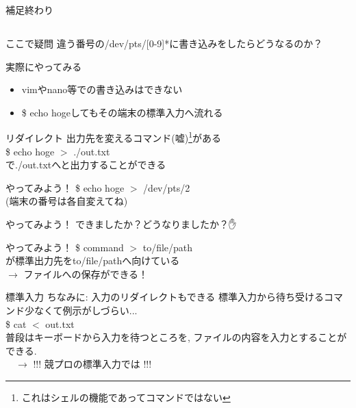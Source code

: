 \documentclass[uplatex, dvipdfmx, unicode]{beamer}
\begin{document}
\begin{frame}
  \centering
  補足終わり
\end{frame}

\subsection{}
\begin{frame}{ここで疑問}
  違う番号の/dev/pts/[0-9]*に書き込みをしたらどうなるのか？
\end{frame}

\begin{frame}{実際にやってみる}
  \begin{itemize}
    \item{vimやnano等での書き込みはできない}
    \item{\$ echo hogeしてもその端末の標準入力へ流れる}
  \end{itemize}
\end{frame}

\begin{frame}{リダイレクト}
  出力先を変えるコマンド(嘘)\footnote{これはシェルの機能であってコマンドではない}がある \\
  \$ echo hoge \alert{$>$ ./out.txt} \\
  で./out.txtへと出力することができる
\end{frame}

\begin{frame}{やってみよう！}
  \$ echo hoge $>$ /dev/pts/2 \\
  (端末の番号は各自変えてね)
\end{frame}

\begin{frame}{やってみよう！}
  できましたか？どうなりましたか？✋
\end{frame}

\begin{frame}{やってみよう！}
  \$ command \alert{$>$ to/file/path} \\
  が標準出力先をto/file/pathへ向けている \\
  $\rightarrow$ ファイルへの保存ができる！
\end{frame}

\begin{frame}{標準入力}
  ちなみに: 入力のリダイレクトもできる
  \tiny{標準入力から待ち受けるコマンド少なくて例示がしづらい...} \\
  \normalsize
  \$ cat $<$ out.txt \\
  \vspace{.2in}
  普段はキーボードから入力を待つところを, ファイルの内容を入力とすることができる. \\
  \ \ $\rightarrow$ !!! 競プロの標準入力では !!! \\
\end{frame}
\end{document}
